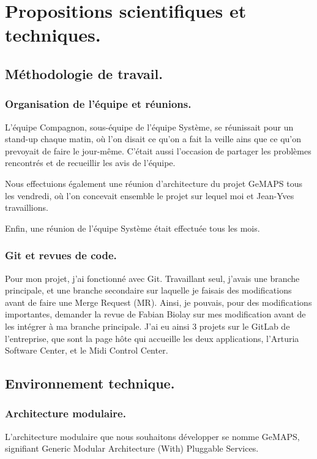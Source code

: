 \documentclass[francais]{rapportPFE}  %
\begin{document}
\section{Propositions scientifiques et techniques.}
\subsection{Méthodologie de travail.}
\subsubsection{Organisation de l'équipe et réunions.}
L'équipe Compagnon, sous-équipe de l'équipe Système, se réunissait pour un stand-up chaque matin, où l'on disait ce qu'on a fait la veille ains que ce qu'on prevoyait de faire le jour-même. C'était aussi l'occasion de partager les problèmes rencontrés et de recueillir les avis de l'équipe.

Nous effectuions également une réunion d'architecture du projet GeMAPS tous les vendredi, où l'on concevait ensemble le projet sur lequel moi et Jean-Yves travaillions. 

Enfin, une réunion de l'équipe Système était effectuée tous les mois.


\subsubsection{Git et revues de code.}
Pour mon projet, j'ai fonctionné avec Git. Travaillant seul, j'avais une branche principale, et une branche secondaire sur laquelle je faisais des modifications avant de faire une Merge Request (MR). Ainsi, je pouvais, pour des modifications importantes, demander la revue de Fabian Biolay sur mes modification avant de les intégrer à ma branche principale. J'ai eu ainsi 3 projets sur le GitLab de l'entreprise, que sont la page hôte qui accueille les deux applications, l'Arturia Software Center, et le Midi Control Center.

\subsection{Environnement technique.}

\subsubsection{Architecture modulaire.}
L'architecture modulaire que nous souhaitons développer se nomme GeMAPS, signifiant Generic Modular Architecture (With) Pluggable Services. 
\end{document}

